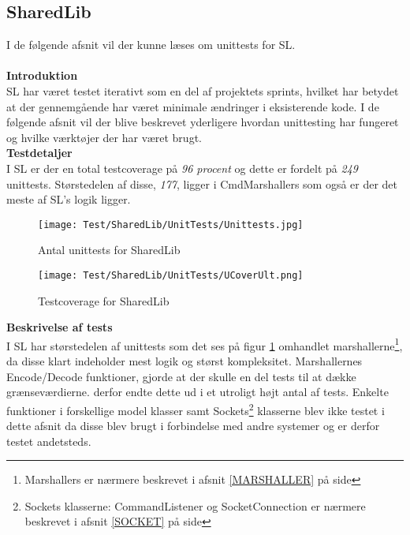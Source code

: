 \subsection{SharedLib}
I de følgende afsnit vil der kunne læses om unittests for \gls{SL}.\\\\


\textbf{Introduktion}\\
\gls{SL} har været testet iterativt som en del af projektets sprints, hvilket har betydet at der gennemgående har været minimale ændringer i eksisterende kode. I de følgende afsnit vil der blive beskrevet yderligere hvordan unittesting har fungeret og hvilke værktøjer der har været brugt.\\

\textbf{Testdetaljer}\\
I \gls{SL} er der en total testcoverage på \textit{96 procent} og dette er fordelt på \textit{249} unittests. Størstedelen af disse, \textit{177}, ligger i CmdMarshallers som også er der det meste af \gls{SL}'s logik ligger. 

\begin{figure}[H]
	\centering
	\texttt{[image: Test/SharedLib/UnitTests/Unittests.jpg]}
	\caption{Antal unittests for SharedLib}
	\label{fig:antalunitSL}
\end{figure}

\begin{figure}[H]
	\centering
	\texttt{[image: Test/SharedLib/UnitTests/UCoverUlt.png]}
	\caption{Testcoverage for SharedLib}
	\label{fig:coverSL}
\end{figure}


\newpage
\textbf{Beskrivelse af tests}\\
I \gls{SL} har størstedelen af unittests som det ses på figur \ref{fig:antalunitSL} omhandlet marshallerne\footnote{Marshallers er nærmere beskrevet i afsnit \ref{MARSHALLER} på side \pageref{MARSHALLER}}, da disse klart indeholder mest logik og størst kompleksitet. Marshallernes Encode/Decode funktioner, gjorde at der skulle en del tests til at dække grænseværdierne. derfor endte dette ud i et utroligt højt antal af tests. Enkelte funktioner i forskellige model klasser samt Sockets\footnote{Sockets klasserne: CommandListener og SocketConnection er nærmere beskrevet i afsnit \ref{SOCKET} på side \pageref{SOCKET}} klasserne blev ikke testet i dette afsnit da disse blev brugt i forbindelse med andre systemer og er derfor testet andetsteds.